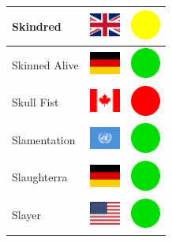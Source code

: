 \documentclass[12pt, a4paper, twoside]{report}
\begin{document}
\begin{center}
\begin{longtable}{|p{5cm}|p{2cm}|p{2cm}|}
Skindred & \includegraphics[width=1cm]{4x3/gb} & \includegraphics[width=1cm]{likes/m} \\ \hline
Skinned Alive & \includegraphics[width=1cm]{4x3/de} & \includegraphics[width=1cm]{likes/y} \\ \hline
Skull Fist & \includegraphics[width=1cm]{4x3/ca} & \includegraphics[width=1cm]{likes/n} \\ \hline
Slamentation & \includegraphics[width=1cm]{4x3/un} & \includegraphics[width=1cm]{likes/y} \\ \hline
Slaughterra & \includegraphics[width=1cm]{4x3/de} & \includegraphics[width=1cm]{likes/y} \\ \hline
Slayer & \includegraphics[width=1cm]{4x3/us} & \includegraphics[width=1cm]{likes/y} \\ \hline

\end{longtable}
\end{center}
\end{document}
